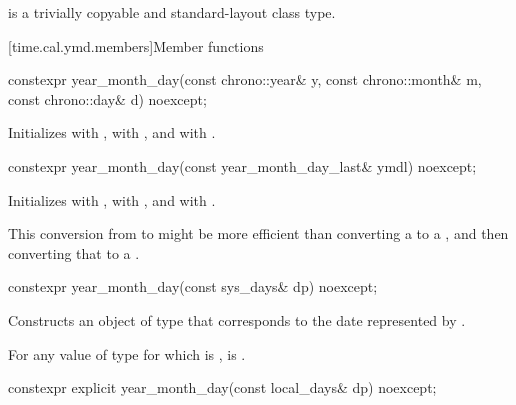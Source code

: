 \pnum
{} is a trivially copyable and standard-layout class type.

[time.cal.ymd.members]{Member functions}

%
\begin{itemdecl}
constexpr year_month_day(const chrono::year& y, const chrono::month& m,
                         const chrono::day& d) noexcept;
\end{itemdecl}

\begin{itemdescr}
\pnum
\effects
Initializes
 with ,
 with , and
 with .
\end{itemdescr}

%
\begin{itemdecl}
constexpr year_month_day(const year_month_day_last& ymdl) noexcept;
\end{itemdecl}

\begin{itemdescr}
\pnum
\effects
Initializes
 with ,
 with , and
 with .
\begin{note}
This conversion from  to 
might be more efficient than converting a  to a ,
and then converting that  to a .
\end{note}
\end{itemdescr}

%
\begin{itemdecl}
constexpr year_month_day(const sys_days& dp) noexcept;
\end{itemdecl}

\begin{itemdescr}
\pnum
\effects
Constructs an object of type 
that corresponds to the date represented by .

\pnum
\remarks
For any value  of type 
for which  is ,
is .
\end{itemdescr}

%
\begin{itemdecl}
constexpr explicit year_month_day(const local_days& dp) noexcept;
\end{itemdecl}

